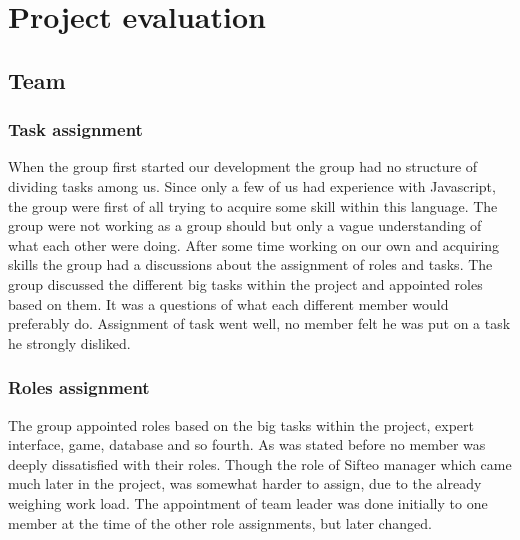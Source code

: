 \chapter{Project evaluation}

\section{Team}

\subsection*{Task assignment}
When the group first started our development the group had no structure of dividing tasks among us. Since only a few of us had experience with Javascript, the group were first of all trying to acquire some skill within this language. The group were not working as a group should but only a vague understanding of what each other were doing. After some time working on our own and acquiring skills the group had a discussions about the assignment of roles and tasks. The group discussed the different big tasks within the project and appointed roles based on them. It was a questions of what each different member would preferably do. Assignment of task went well, no member felt he was put on a task he strongly disliked.

\subsection*{Roles assignment}

The group appointed roles based on the big tasks within the project, expert interface, game, database and so fourth. As was stated before no member was deeply dissatisfied with their roles. Though the role of Sifteo manager which came much later in the project, was somewhat harder to assign, due to the already weighing work load. The appointment of team leader was done initially to one member at the time of the other role assignments, but later changed. 

